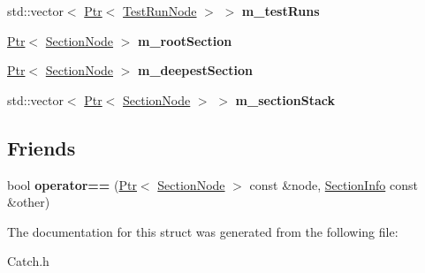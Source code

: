 \begin{DoxyCompactItemize}
\item 
\hypertarget{struct_catch_1_1_cumulative_reporter_base_abbcd7bb9f8ec2dff8520c2d04df1e6ce}{std\-::vector$<$ \hyperlink{class_catch_1_1_ptr}{Ptr}$<$ \hyperlink{struct_catch_1_1_cumulative_reporter_base_1_1_node}{Test\-Run\-Node} $>$ $>$ {\bfseries m\-\_\-test\-Runs}}\label{struct_catch_1_1_cumulative_reporter_base_abbcd7bb9f8ec2dff8520c2d04df1e6ce}

\item 
\hypertarget{struct_catch_1_1_cumulative_reporter_base_a407c1ad0723f3e10efbb982c5adbd07c}{\hyperlink{class_catch_1_1_ptr}{Ptr}$<$ \hyperlink{struct_catch_1_1_cumulative_reporter_base_1_1_section_node}{Section\-Node} $>$ {\bfseries m\-\_\-root\-Section}}\label{struct_catch_1_1_cumulative_reporter_base_a407c1ad0723f3e10efbb982c5adbd07c}

\item 
\hypertarget{struct_catch_1_1_cumulative_reporter_base_a9058ef2fc03d698503fccd918c64d0f2}{\hyperlink{class_catch_1_1_ptr}{Ptr}$<$ \hyperlink{struct_catch_1_1_cumulative_reporter_base_1_1_section_node}{Section\-Node} $>$ {\bfseries m\-\_\-deepest\-Section}}\label{struct_catch_1_1_cumulative_reporter_base_a9058ef2fc03d698503fccd918c64d0f2}

\item 
\hypertarget{struct_catch_1_1_cumulative_reporter_base_ae64972fbf6026c4f72ebbc9c0b1c9d41}{std\-::vector$<$ \hyperlink{class_catch_1_1_ptr}{Ptr}$<$ \hyperlink{struct_catch_1_1_cumulative_reporter_base_1_1_section_node}{Section\-Node} $>$ $>$ {\bfseries m\-\_\-section\-Stack}}\label{struct_catch_1_1_cumulative_reporter_base_ae64972fbf6026c4f72ebbc9c0b1c9d41}

\end{DoxyCompactItemize}
\subsection*{Friends}
\begin{DoxyCompactItemize}
\item 
\hypertarget{struct_catch_1_1_cumulative_reporter_base_a8a9f836c62348333bde04b059851b738}{bool {\bfseries operator==} (\hyperlink{class_catch_1_1_ptr}{Ptr}$<$ \hyperlink{struct_catch_1_1_cumulative_reporter_base_1_1_section_node}{Section\-Node} $>$ const \&node, \hyperlink{struct_catch_1_1_section_info}{Section\-Info} const \&other)}\label{struct_catch_1_1_cumulative_reporter_base_a8a9f836c62348333bde04b059851b738}

\end{DoxyCompactItemize}


The documentation for this struct was generated from the following file\-:\begin{DoxyCompactItemize}
\item 
Catch.\-h\end{DoxyCompactItemize}
